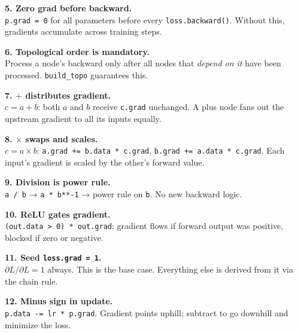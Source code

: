 \documentclass[12pt,a4paper]{article}
\newcommand{\code}[1]{\texttt{\small\color{deepblue}#1}}
\begin{document}
\begin{stickybox}
\textbf{5. Zero grad before backward.}\\
\code{p.grad = 0} for all parameters before every \code{loss.backward()}. Without this, gradients accumulate across training steps.
\end{stickybox}

\begin{stickybox}
\textbf{6. Topological order is mandatory.}\\
Process a node's backward only after all nodes that \emph{depend on it} have been processed. \code{build\_topo} guarantees this.
\end{stickybox}

\begin{stickybox}
\textbf{7. $+$ distributes gradient.}\\
$c = a + b$: both $a$ and $b$ receive \code{c.grad} unchanged. A plus node fans out the upstream gradient to all its inputs equally.
\end{stickybox}

\begin{stickybox}
\textbf{8. $\times$ swaps and scales.}\\
$c = a \times b$: \code{a.grad += b.data * c.grad}, \code{b.grad += a.data * c.grad}. Each input's gradient is scaled by the other's forward value.
\end{stickybox}

\begin{stickybox}
\textbf{9. Division is power rule.}\\
\code{a / b} → \code{a * b**-1} → power rule on \code{b}. No new backward logic.
\end{stickybox}

\begin{stickybox}
\textbf{10. ReLU gates gradient.}\\
\code{(out.data > 0) * out.grad}: gradient flows if forward output was positive, blocked if zero or negative.
\end{stickybox}

\begin{stickybox}
\textbf{11. Seed \texttt{loss.grad = 1}.}\\
$\partial L / \partial L = 1$ always. This is the base case. Everything else is derived from it via the chain rule.
\end{stickybox}

\begin{stickybox}
\textbf{12. Minus sign in update.}\\
\code{p.data -= lr * p.grad}. Gradient points uphill; subtract to go downhill and minimize the loss.
\end{stickybox}
\end{document}
